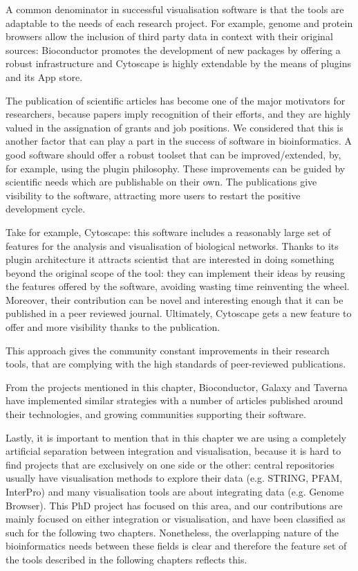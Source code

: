 A common denominator in successful visualisation software is that the tools are adaptable to the needs of each research project. For example, genome and protein browsers allow the inclusion of third party data in context with their original sources: Bioconductor promotes the development of new packages by offering a robust infrastructure and Cytoscape is highly extendable by the means of plugins and its App store. 

The publication of scientific articles has become one of the major motivators for researchers, because papers imply recognition of their efforts, and they are highly valued in the assignation of grants and job positions. We considered that this is another factor that can play a part in the success of software in bioinformatics. A good software should offer a robust toolset that can be improved/extended, by, for example, using the plugin philosophy. These improvements can be guided by scientific needs which are publishable on their own. The publications give visibility to the software, attracting more users to restart the positive development cycle.

Take for example, Cytoscape: this software includes a reasonably large set of features for the analysis and visualisation of biological networks. Thanks to its plugin architecture it attracts scientist that are interested in doing something beyond the original scope of the tool: they can implement their ideas by reusing the features offered by the software, avoiding wasting time reinventing the wheel. Moreover, their contribution can be novel and interesting enough that it can be published in a peer reviewed journal. Ultimately, Cytoscape gets a new feature to offer and more visibility thanks to the publication. 

This approach gives the community constant improvements in their research tools, that are complying with the high standards of peer-reviewed publications. 

From the projects mentioned in this chapter, Bioconductor, Galaxy and Taverna have implemented similar strategies with a number of articles published around their technologies, and growing communities supporting their software.

Lastly, it is important to mention that in this chapter we are using a completely artificial separation between integration and visualisation, because it is hard to find projects that are exclusively on one side or the other: central repositories usually have visualisation methods to explore their data (e.g. STRING, PFAM, InterPro) and many visualisation tools are about integrating data (e.g. Genome Browser). This PhD project has focused on this area, and our contributions are mainly focused on either integration or visualisation, and have been classified as such for the following two chapters. Nonetheless, the overlapping nature of the bioinformatics needs between these fields is clear and therefore the feature set of the tools described in the following chapters reflects this. 

